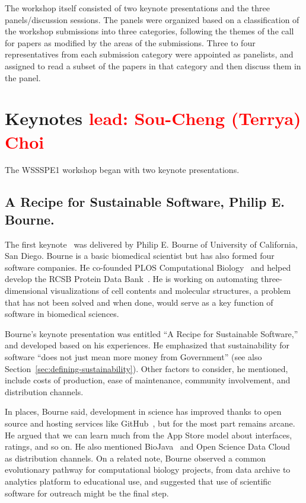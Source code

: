 \documentclass[11pt, oneside]{amsart}
\newcommand{\note}[1]{ {\textcolor{red}    { #1 }}}
\begin{document}
The workshop itself consisted of two keynote presentations and the
three panels/discussion sessions. The panels were organized based on a
classification of the workshop submissions into three categories,
following the themes of the call for papers as modified by the areas
of the submissions. Three to four representatives from each submission
category were appointed as panelists, and assigned to read a subset of
the papers in that category and then discuss them in the panel.


\section{Keynotes \note{lead: Sou-Cheng (Terrya) Choi}} \label{sec:keynotes}

The WSSSPE1 workshop began with two keynote presentations.

\subsection{A Recipe for Sustainable Software, Philip E. Bourne.} \label{sec:keynote1}

The first keynote~\cite{WSSSPE1-keynote1} was delivered by Philip
E. Bourne of University of California, San Diego.  Bourne is a basic
biomedical scientist but has also formed four software companies. He co-founded
PLOS Computational Biology~\cite{plos-web} and helped develop the RCSB
Protein Data Bank~\cite{pdb-web}.
He is working on automating three-dimensional visualizations of cell
contents and molecular structures, a problem that has not been solved
and when done, would serve as a key function of software in biomedical
sciences.

Bourne's keynote presentation was entitled ``A Recipe for Sustainable
Software,'' and developed based on his experiences.  He emphasized that
sustainability for software ``does not just mean more money from
Government'' (see also Section~\ref{sec:defining-sustainability}).  Other
factors to consider, he mentioned, include costs of production, ease
of maintenance, community involvement, and distribution channels.

In places, Bourne said, development in science has improved thanks to
open source and hosting services like GitHub~\cite{github-web}, but for the most part
remains arcane. He argued that we can learn much from the App Store
model about interfaces, ratings, and so on. He also mentioned
BioJava~\cite{biojava-web} and Open Science Data Cloud~\cite{osdc-web}
as distribution channels.  On a related note, Bourne observed a common
evolutionary pathway for computational biology projects, from data
archive to analytics platform to educational use, and suggested that
use of scientific software for outreach might be the final step.
\end{document}
